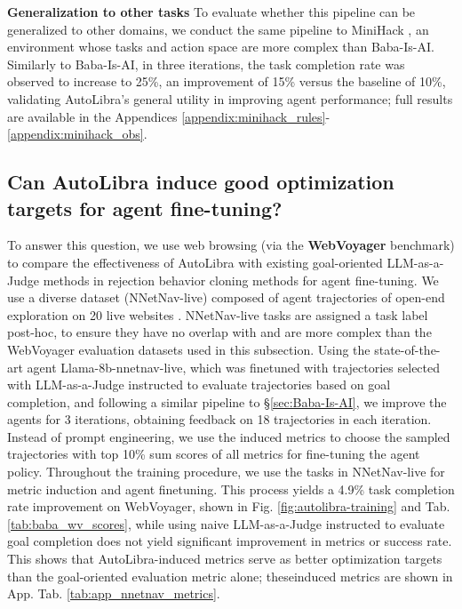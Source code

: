 \textbf{Generalization to other tasks} To evaluate whether this pipeline can be generalized
to other domains, we conduct the same pipeline to MiniHack \citep{samvelyan2021minihackplanetsandboxopenended},
an environment whose tasks and action space are more complex than Baba-Is-AI. Similarly
to Baba-Is-AI, in three iterations, the task completion rate was observed to increase
to 25\%, an improvement of 15\% versus the baseline of 10\%, validating
AutoLibra's general utility in improving agent performance; full results are available
in the Appendices \ref{appendix:minihack_rules}-\ref{appendix:minihack_obs}.

\subsection{Can AutoLibra induce good optimization targets for agent fine-tuning?}
\label{sec:webvoyager} To answer this question, we use web browsing (via the \textbf{WebVoyager}
\citep{he2024webvoyager} benchmark) to compare the effectiveness of AutoLibra
with existing goal-oriented LLM-as-a-Judge methods in rejection behavior cloning
methods for agent fine-tuning. We use a diverse dataset (NNetNav-live) composed of
agent trajectories of open-end exploration on 20 live websites \citep{Murty2025NNetNav}.
NNetNav-live tasks are assigned a task label post-hoc, to ensure they have no
overlap with and are more complex than the WebVoyager evaluation datasets used
in this subsection. Using the state-of-the-art agent Llama-8b-nnetnav-live,
which was finetuned with trajectories selected with LLM-as-a-Judge instructed to
evaluate trajectories based on goal completion, and following a similar pipeline
to \S\ref{sec:Baba-Is-AI}, we improve the agents for 3 iterations, obtaining
feedback on 18 trajectories in each iteration. Instead of prompt engineering, we
use the induced metrics to choose the sampled trajectories with top 10\% sum scores
of all metrics for fine-tuning the agent policy. Throughout the training
procedure, we use the tasks in NNetNav-live \citep{Murty2025NNetNav} for metric
induction and agent finetuning. This process yields a 4.9\% task completion rate
improvement on WebVoyager, shown in Fig. \ref{fig:autolibra-training} and Tab. \ref{tab:baba_wv_scores},
while using naive LLM-as-a-Judge instructed to evaluate goal completion does not
yield significant improvement in metrics or success rate. This shows that AutoLibra-induced
metrics serve as better optimization targets than the goal-oriented evaluation metric
alone; theseinduced metrics are shown in App. Tab. \ref{tab:app_nnetnav_metrics}.